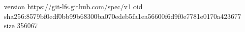 version https://git-lfs.github.com/spec/v1
oid sha256:8579bf0edf0bb99b68300ba070edeb5fa1ea56600f6d9f0e7781e0170a423677
size 356067
